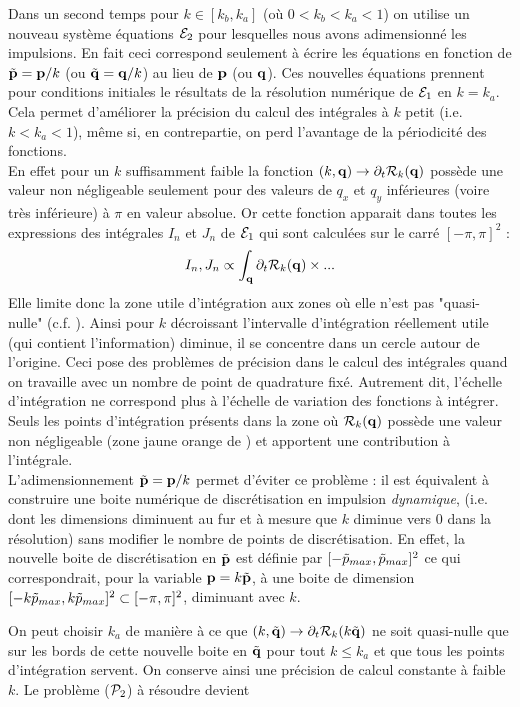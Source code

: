 \documentclass[10pt]{article}
\begin{document}
\begin{multicols}{2}
Dans un second temps pour $k \in [k_b, k_a]$ (où $ 0 < k_b < k_a < 1$) on utilise un nouveau système équations $\mathcal{E}_2$ pour lesquelles nous avons adimensionné les impulsions. En fait ceci correspond seulement à écrire les équations en fonction de $\tilde{{\bf p}} = {\bf p}/k$ (ou $\tilde{{\bf q}} = {\bf q}/k$) au lieu de ${\bf p}$ (ou ${\bf q}$). Ces nouvelles équations prennent pour conditions initiales le résultats de la résolution numérique de $\mathcal{E}_1$ en $k = k_a$. Cela permet d'améliorer la précision du calcul des intégrales à $k$ petit (i.e. $k < k_a < 1$), même si, en contrepartie, on perd l'avantage de la périodicité des fonctions. \\
\indent
En effet pour un $k$ suffisamment faible la fonction $(k,{\bf q}) \to \partial_t \mathcal{R}_k({\bf q})$ possède une valeur non négligeable seulement pour des valeurs de $q_x$ et $q_y$ inférieures (voire très inférieure) à $\pi$ en valeur absolue. Or cette fonction apparait dans toutes les expressions des intégrales $I_n$ et $J_n$ de $\mathcal{E}_1$ qui sont calculées sur le carré $[-\pi, \pi]^2$ : 
\begin{equation}
	I_n, J_n \propto \int_{\bf q} \partial_t \mathcal{R}_k({\bf q})\times ... 
\end{equation}
Elle limite donc la zone utile d'intégration aux zones où elle n'est pas "quasi-nulle" (c.f. ). Ainsi pour $k$ décroissant l'intervalle d'intégration réellement utile (qui contient l'information) diminue, il se concentre dans un cercle autour de l'origine. Ceci pose des problèmes de précision dans le calcul des intégrales quand on travaille avec un nombre de point de quadrature fixé. Autrement dit, l'échelle d'intégration ne correspond plus à l'échelle de variation des fonctions à intégrer. Seuls les points d'intégration présents dans la zone où $\mathcal{R}_k({\bf q})$ possède une valeur non négligeable (zone jaune orange de ) et apportent une contribution à l'intégrale. \\
\indent
L'adimensionnement $\tilde{{\bf p}} = {\bf p}/k$ permet d'éviter ce problème : il est équivalent à construire une boite numérique de discrétisation en impulsion \textit{dynamique}, (i.e. dont les dimensions diminuent au fur et à mesure que $k$ diminue vers $0$ dans la résolution) sans modifier le nombre de points de discrétisation. 
En effet, la nouvelle boite de discrétisation en $\tilde{{\bf p}}$ est définie par $[-\tilde{p}_{max}, \tilde{p}_{max}]^2$ ce qui correspondrait, pour la variable ${\bf p}= k\tilde{{\bf p}}$, à une boite de dimension $[-k\tilde{p}_{max}, k\tilde{p}_{max}]^2 \subset [-\pi, \pi]^2$, diminuant avec $k$.


On peut choisir $k_a$ de manière à ce que $(k,\tilde{{\bf q}}) \to \partial_t \mathcal{R}_k(k\tilde{{\bf q}})$ ne soit quasi-nulle que sur les bords de cette nouvelle boite en $\tilde{{\bf q}}$ pour tout $k \le k_a$ et que tous les points d'intégration servent. On conserve ainsi une précision de calcul constante à faible $k$. Le problème ($\mathcal{P}_2$) à résoudre devient \\



\end{multicols}
\end{document}

